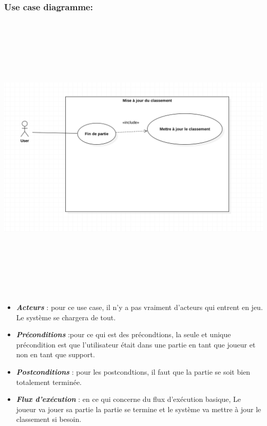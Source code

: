\documentclass[10pt,a4paper]{article}
\begin{document}
\subsubsection{Use case diagramme:}	
\begin{center}
    \includegraphics[height=14cm,width=17cm]{maj_classement.png}
\end{center}
\begin{itemize}

\item \textit{\textbf{Acteurs}} : pour ce use case, il n'y a pas vraiment d'acteurs qui entrent en jeu. Le système se chargera de tout.\\

\item \textit{\textbf{Préconditions}} :pour ce qui est des précondtions, la seule et unique précondition est que l'utilisateur était dans une partie en tant que joueur et non en tant que support.\\

\item \textit{\textbf{Postconditions}} : pour les postcondtions, il faut que la partie se soit bien totalement terminée.\\

\item \textit{\textbf{Flux d'exécution}} : en ce qui concerne du flux d'exécution basique, Le joueur va jouer sa partie la partie se termine et le système va mettre à jour le classement si besoin.\\
\end{itemize}
\end{document}
